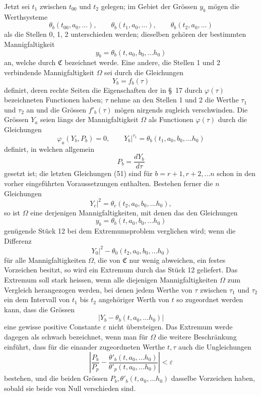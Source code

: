 \documentclass[11pt,a4paper,leqno]{article}
\begin{document}
Jetzt sei $t_1$ zwischen $t_{00}$ und $t_2$ gelegen; im Gebiet der Grössen $y_b$ mögen die Werthsysteme
\[
\theta_b(t_{00},a_0,\ldots),
\qquad
\theta_b(t_1,a_0,\ldots),
\qquad
\theta_b(t_2,a_0,\ldots)
\]
als die Stellen 0, 1, 2 unterschieden werden; dieselben gehören der bestimmten Mannigfaltigkeit
\[
y_b=\theta_b(t,a_0,b_0,\ldots h_0)
\]
an, welche durch $\mathfrak{C}$ bezeichnet werde. Eine andere, die Stellen 1 und 2 verbindende Mannigfaltigkeit $\Omega$ sei durch die Gleichungen
\[
Y_b=f_b(\tau)
\]
definirt, deren rechte Seiten die Eigenschaften der in \S~17 durch $\varphi(\tau)$ bezeichneten Functionen haben; $\tau$ nehme an den Stellen 1 und 2 die Werthe $\tau_1$ und $\tau_2$ an und die Grössen $f'_b(\tau)$ mögen
nirgends zugleich verschwinden. Die Grössen $Y_a$ seien längs der Mannigfaltigkeit $\Omega$ als Functionen $\varphi(\tau)$ durch die Gleichungen
\begin{equation}\tag{51}
\varphi_a(Y_b,P_b)=0,
\qquad
\left.Y_b\right|^{\tau_1}=\theta_b(t_1,a_0,b_0,\ldots h_0)
\end{equation}
definirt, in welchen allgemein
\[
P_b=\frac{dY_b}{d\tau}
\]
gesetzt ist; die letzten Gleichungen (51) sind für $b=r+1,r+2,\ldots n$ schon in den vorher eingeführten Voraussetzungen enthalten. Bestehen ferner die $n$ Gleichungen
\[
\left.Y_c\right|^2=\theta_c(t_2,a_0,b_0,\ldots h_0),
\]
so ist $\Omega$ eine derjenigen Mannigfaltigkeiten, mit denen das den Gleichungen
\[
y_b=\theta_b(t,a_0,b_0,\ldots h_0)
\]
genügende Stück 12 bei dem Extremumsproblem verglichen wird; wenn die Differenz
\[
\left.Y_0\right|^2-\theta_0(t_2,a_0,b_0,\ldots h_0)
\]
für alle Mannigfaltigkeiten $\Omega$, die von $\mathfrak{C}$ nur wenig abweichen, ein festes Vorzeichen besitzt, so wird ein Extremum durch das Stück 12 geliefert. Das Extremum soll stark heissen, wenn alle diejenigen Mannigfaltigkeiten $\Omega$ zum Vergleich herangezogen werden, bei denen jedem Werthe von $\tau$ zwischen $\tau_1$ und $\tau_2$ ein dem Intervall von $t_1$ bis $t_2$ angehöriger Werth von $t$ so zugeordnet werden kann, dass die Grössen
\[
\left|Y_b-\theta_b(t,a_0,\ldots h_0)\right|
\]
eine gewisse positive Constante $\varepsilon$ nicht übersteigen. Das Extremum werde dagegen als schwach bezeichnet, wenn man für $\Omega$ die weitere Beschränkung einführt, dass für die einander zugeordneten Werthe $t,\tau$ auch die Ungleichungen
\begin{equation}\tag{52}
\left|
\frac{P_b}{P_p}
-\frac{\theta'_b(t,a_0,\ldots h_0)}{\theta'_p(t,a_0,\ldots h_0)}
\right|<\varepsilon
\end{equation}
bestehen, und die beiden Grössen $P_b,\theta'_b(t,a_0,\ldots h_0)$ dasselbe Vorzeichen haben, sobald sie beide von Null verschieden sind.
\end{document}
